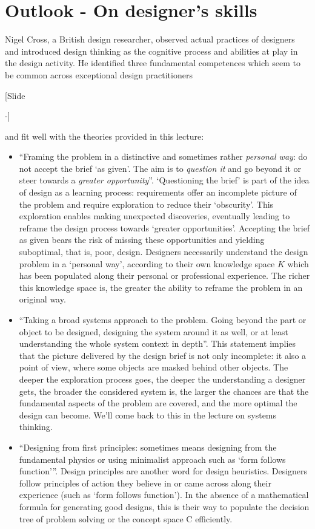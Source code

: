 \documentclass{article}
\newcounter{slide}
\begin{document}
\section{Outlook - On designer's skills}
\label{sec:skills}
Nigel Cross, a British design researcher, observed actual practices of designers and introduced design thinking as the cognitive process and abilities at play in the design activity. He identified three fundamental competences which seem to be common across exceptional design practitioners {\color{blue}[Slide \addtocounter{slide}{2}-]}\cite[reformulated by Elies Dekonkinck]{crossDesignThinkingUnderstanding2011} and fit well with the theories provided in this lecture: 
\begin{itemize}
	\item ``Framing the problem in a distinctive and sometimes rather \emph{personal way}: do not accept the brief `as given'. The aim is to \emph{question it} and go beyond it or steer towards a \emph{greater opportunity}''. `Questioning the brief' is part of the idea of design as a learning process: requirements offer an incomplete picture of the problem and require exploration to reduce their `obscurity'. This exploration enables making unexpected discoveries, eventually leading to reframe the design process towards `greater opportunities'. Accepting the brief as given bears the risk of missing these opportunities and yielding suboptimal, that is, poor, design. Designers necessarily understand the design problem in a `personal way', according to their own knowledge space $K$ which has been populated along their personal or professional experience. The richer this knowledge space is, the greater the ability to reframe the problem in an original way.
	\item ``Taking a broad systems approach to the problem. Going beyond the part or object to be designed, designing the system around it as well, or at least understanding the whole system context in depth''. This statement implies that the picture delivered by the design brief is not only incomplete: it also a point of view, where some objects are masked behind other objects. The deeper the exploration process goes, the deeper the understanding a designer gets, the broader the considered system is, the larger the chances are that the fundamental aspects of the problem are covered, and the more optimal the design can become. We'll come back to this in the lecture on systems thinking. 
	\item ``Designing from first principles: sometimes means designing from the fundamental physics or using minimalist approach such as `form follows function'''. Design principles are another word for design heuristics. Designers follow principles of action they believe in or came across along their experience (such as `form follows function'). In the absence of a mathematical formula for generating good designs, this is their way to populate the decision tree of problem solving or the concept space C efficiently. 
\end{itemize}
\end{document}
